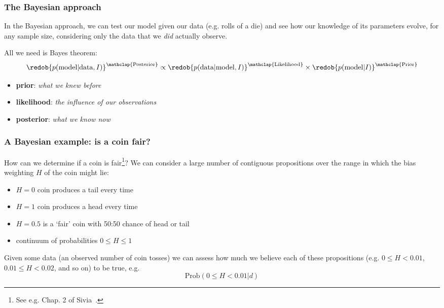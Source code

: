 \begin{frame}

\frametitle{The Bayesian approach}
\label{thebayesianapproach}

In the Bayesian approach, we can test our model given our data (e.g. rolls of a die) and see how
our knowledge of its parameters evolve, for any sample size, considering only the data that we \emph{did}
actually observe.

All we need is Bayes theorem:
\[
\redob{p(\text{model}|\text{data},I)}^{\mathclap{\text{Posterior}}} \propto
\redob{p(\text{data}|\text{model},I)}^{\mathclap{\text{Likelihood}}} \times 
\redob{p(\text{model}|I)}^{\mathclap{\text{Prior}}}
\]

\begin{itemize}
\item \textbf{prior}: \emph{what we knew before}

\item \textbf{likelihood}: \emph{the influence of our observations}

\item \textbf{posterior}: \emph{what we know now}

\end{itemize}

\end{frame}

\begin{frame}

\frametitle{A Bayesian example: is a coin fair?}
\label{abayesianexample:isacoinfair}

How can we determine if a coin is fair\footnote{See e.g. Chap. 2 of Sivia~\citep{Sivia}.}? We can consider a large number of contiguous propositions over
the range in which the bias weighting $H$ of the coin might lie:

\begin{itemize}
\item $H = 0$ coin produces a tail every time

\item $H = 1$ coin produces a head every time

\item $H = 0.5$ is a `fair' coin with 50:50 chance of head or tail

\item continuum of probabilities $0 \le H \le 1$

\end{itemize}

Given some data (an observed number of coin tosses) we can assess how much we believe each of
these propositions (e.g. $0 \le H < 0.01$, $0.01 \le H < 0.02$, and so on) to be true, e.g.
\[
\text{Prob}(0 \le H < 0.01|d)
\]

\end{frame}

